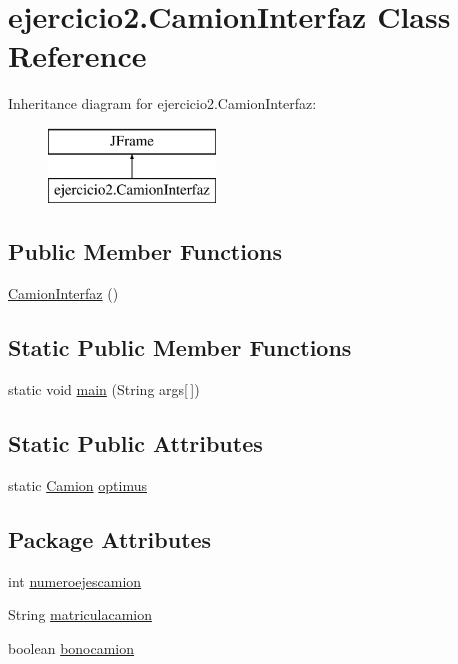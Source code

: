\hypertarget{classejercicio2_1_1_camion_interfaz}{}\section{ejercicio2.\+Camion\+Interfaz Class Reference}
\label{classejercicio2_1_1_camion_interfaz}
Inheritance diagram for ejercicio2.\+Camion\+Interfaz\+:\begin{figure}[H]
\begin{center}
\leavevmode
\includegraphics[height=2.000000cm]{classejercicio2_1_1_camion_interfaz}
\end{center}
\end{figure}
\subsection*{Public Member Functions}
\begin{DoxyCompactItemize}
\item 
\mbox{\hyperlink{classejercicio2_1_1_camion_interfaz_a76d59d7f6e7f1f1380532327a3850ed6}{Camion\+Interfaz}} ()
\end{DoxyCompactItemize}
\subsection*{Static Public Member Functions}
\begin{DoxyCompactItemize}
\item 
static void \mbox{\hyperlink{classejercicio2_1_1_camion_interfaz_aa938c4f6c6d04841d1258d1ee696e9f5}{main}} (String args\mbox{[}$\,$\mbox{]})
\end{DoxyCompactItemize}
\subsection*{Static Public Attributes}
\begin{DoxyCompactItemize}
\item 
static \mbox{\hyperlink{classejercicio2_1_1_camion}{Camion}} \mbox{\hyperlink{classejercicio2_1_1_camion_interfaz_a07c8db8092cf51269976606c2b1ffd84}{optimus}}
\end{DoxyCompactItemize}
\subsection*{Package Attributes}
\begin{DoxyCompactItemize}
\item 
int \mbox{\hyperlink{classejercicio2_1_1_camion_interfaz_ac62a60d4d186e1ca2a5728b6ad45caa1}{numeroejescamion}}
\item 
String \mbox{\hyperlink{classejercicio2_1_1_camion_interfaz_a05bc47d68334029c8a8245158ee16b59}{matriculacamion}}
\item 
boolean \mbox{\hyperlink{classejercicio2_1_1_camion_interfaz_a77b05c1adddfc9df05f67aae05d794bf}{bonocamion}}
\end{DoxyCompactItemize}
